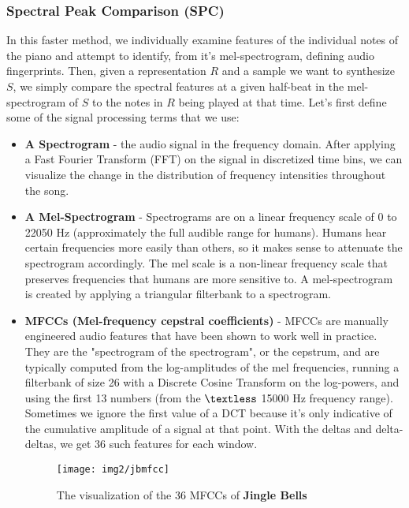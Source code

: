 \documentclass{pnastwo}
\begin{document}
\begin{article}
\subsubsection{Spectral Peak Comparison (SPC)}
In this faster method, we individually examine features of the individual notes of the piano and attempt to identify, from it's mel-spectrogram, defining audio fingerprints. Then, given a representation $R$ and a sample we want to synthesize $S$, we simply compare the spectral features at a given half-beat in the mel-spectrogram of $S$ to the notes in $R$ being played at that time. Let's first define some of the signal processing terms that we use:
 \begin{itemize}
    \item \textbf{A Spectrogram} - the audio signal in the frequency domain. After applying a Fast Fourier Transform (FFT) on the signal in discretized time bins, we can visualize the change in the distribution of frequency intensities throughout the song. \\
    \item \textbf{A Mel-Spectrogram} - Spectrograms are on a linear frequency scale of 0 to 22050 Hz (approximately the full audible range for humans). Humans hear certain frequencies more easily than others, so it makes sense to attenuate the spectrogram accordingly. The mel scale is a non-linear frequency scale that preserves frequencies that humans are more sensitive to. A mel-spectrogram is created by applying a triangular filterbank to a spectrogram. \\
    \item \textbf{MFCCs (Mel-frequency cepstral coefficients)} - MFCCs are manually engineered audio features that have been shown to work well in practice. They are the "spectrogram of the spectrogram", or the cepstrum, and are typically computed from the log-amplitudes of the mel frequencies, running a filterbank of size 26 with a Discrete Cosine Transform on the log-powers, and using the first 13 numbers (from the $\textless$ 15000 Hz frequency range). Sometimes we ignore the first value of a DCT because it's only indicative of the cumulative amplitude of a signal at that point. With the deltas and delta-deltas, we get 36 such features for each window. \\
\begin{figure}
\centerline{\texttt{[image: img2/jbmfcc]}}
\caption{The visualization of the 36 MFCCs of \textbf{Jingle Bells}}\label{fig4}
\end{figure}

\end{itemize}
\end{article}
\end{document}
